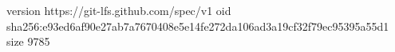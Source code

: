 version https://git-lfs.github.com/spec/v1
oid sha256:e93ed6af90e27ab7a7670408e5e14fe272da106ad3a19cf32f79ec95395a55d1
size 9785
